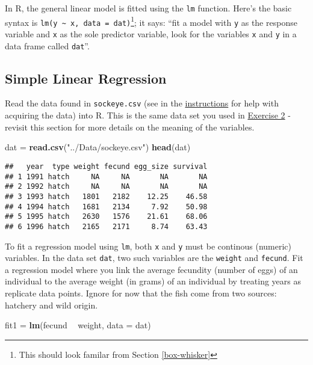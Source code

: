 \documentclass[]{book}
\newenvironment{Shaded}{\begin{snugshade}}{\end{snugshade}}
\newcommand{\KeywordTok}[1]{\textcolor[rgb]{0.13,0.29,0.53}{\textbf{#1}}}
\newcommand{\DataTypeTok}[1]{\textcolor[rgb]{0.13,0.29,0.53}{#1}}
\newcommand{\StringTok}[1]{\textcolor[rgb]{0.31,0.60,0.02}{#1}}
\newcommand{\OperatorTok}[1]{\textcolor[rgb]{0.81,0.36,0.00}{\textbf{#1}}}
\newcommand{\NormalTok}[1]{#1}
\let\rmarkdownfootnote\footnote%
\def\footnote{\protect\rmarkdownfootnote}
\theoremstyle{definition}
\theoremstyle{definition}
\theoremstyle{definition}
\theoremstyle{remark}
\begin{document}
In R, the general linear model is fitted using the \texttt{lm} function.
Here's the basic syntax is
\texttt{lm(y\ \textasciitilde{}\ x,\ data\ =\ dat)}\footnote{This should
  look familar from Section \ref{box-whisker}}; it says: ``fit a model
with \texttt{y} as the response variable and \texttt{x} as the sole
predictor variable, look for the variables \texttt{x} and \texttt{y} in
a data frame called \texttt{dat}''.

\subsection{Simple Linear Regression}\label{regression}

Read the data found in \texttt{sockeye.csv} (see in the
\protect\hyperlink{data-sets}{instructions} for help with acquiring the
data) into R. This is the same data set you used in
\protect\hyperlink{ex2}{Exercise 2} - revisit this section for more
details on the meaning of the variables.

\begin{Shaded}
\begin{Highlighting}[]
\NormalTok{dat =}\StringTok{ }\KeywordTok{read.csv}\NormalTok{(}\StringTok{"../Data/sockeye.csv"}\NormalTok{)}
\KeywordTok{head}\NormalTok{(dat)}
\end{Highlighting}
\end{Shaded}

\begin{verbatim}
##   year  type weight fecund egg_size survival
## 1 1991 hatch     NA     NA       NA       NA
## 2 1992 hatch     NA     NA       NA       NA
## 3 1993 hatch   1801   2182    12.25    46.58
## 4 1994 hatch   1681   2134     7.92    50.98
## 5 1995 hatch   2630   1576    21.61    68.06
## 6 1996 hatch   2165   2171     8.74    63.43
\end{verbatim}

To fit a regression model using \texttt{lm}, both \texttt{x} and
\texttt{y} must be continous (numeric) variables. In the data set
\texttt{dat}, two such variables are the \texttt{weight} and
\texttt{fecund}. Fit a regression model where you link the average
fecundity (number of eggs) of an individual to the average weight (in
grams) of an individual by treating years as replicate data points.
Ignore for now that the fish come from two sources: hatchery and wild
origin.

\begin{Shaded}
\begin{Highlighting}[]
\NormalTok{fit1 =}\StringTok{ }\KeywordTok{lm}\NormalTok{(fecund }\OperatorTok{~}\StringTok{ }\NormalTok{weight, }\DataTypeTok{data =}\NormalTok{ dat)}
\end{Highlighting}
\end{Shaded}
\end{document}
